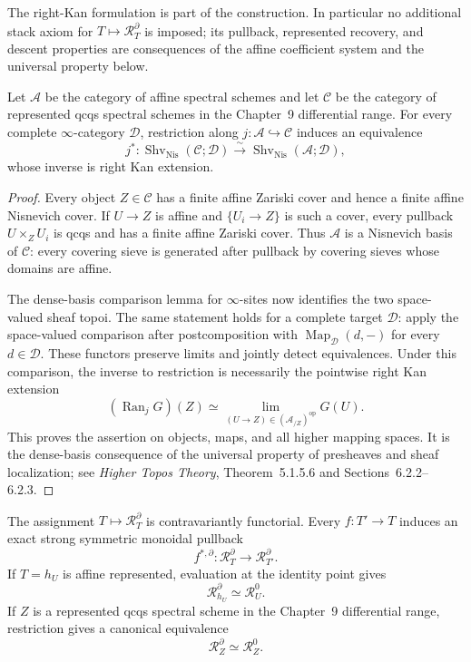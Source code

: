 The right-Kan formulation is part of the construction.  In particular no
additional stack axiom for $T\mapsto\mathcal R_T^{\partial}$ is imposed; its
pullback, represented recovery, and descent properties are consequences of the
affine coefficient system and the universal property below.

\begin{lemma}
\label{lem:prequantum-affine-nisnevich-basis-recovery}
Let $\mathcal A$ be the category of affine spectral schemes and let
$\mathcal C$ be the category of represented qcqs spectral schemes in the
Chapter~9 differential range.  For every complete $\infty$-category
$\mathcal D$, restriction along $j:\mathcal A\hookrightarrow\mathcal C$
induces an equivalence
\[
\boxed{
j^*:
\operatorname{Shv}_{\mathrm{Nis}}(\mathcal C;\mathcal D)
\xrightarrow{\ \sim\ }
\operatorname{Shv}_{\mathrm{Nis}}(\mathcal A;\mathcal D),
}
\]
whose inverse is right Kan extension.
\end{lemma}

\begin{proof}
Every object $Z\in\mathcal C$ has a finite affine Zariski cover and hence a
finite affine Nisnevich cover.  If $U\to Z$ is affine and
$\{U_i\to Z\}$ is such a cover, every pullback $U\times_ZU_i$ is qcqs and
has a finite affine Zariski cover.  Thus $\mathcal A$ is a Nisnevich basis of
$\mathcal C$: every covering sieve is generated after pullback by covering
sieves whose domains are affine.

The dense-basis comparison lemma for $\infty$-sites now identifies the two
space-valued sheaf topoi.  The same statement holds for a complete target
$\mathcal D$: apply the space-valued comparison after postcomposition with
$\operatorname{Map}_{\mathcal D}(d,-)$ for every $d\in\mathcal D$.  These
functors preserve limits and jointly detect equivalences.  Under this
comparison, the inverse to restriction is necessarily the pointwise right Kan
extension
\[
(\operatorname{Ran}_jG)(Z)
\simeq
\lim_{(U\to Z)\in(\mathcal A_{/Z})^{\mathrm{op}}}G(U).
\]
This proves the assertion on objects, maps, and all higher mapping spaces.  It
is the dense-basis consequence of the universal property of presheaves and
sheaf localization; see \emph{Higher Topos Theory},
Theorem~5.1.5.6 and Sections~6.2.2--6.2.3.
\end{proof}

\begin{proposition}
\label{prop:prequantum-big-differential-recovery-pullback}
The assignment $T\mapsto\mathcal R_T^{\partial}$ is contravariantly functorial.
Every $f:T'\to T$ induces an exact strong symmetric monoidal pullback
\[
f^{*,\partial}:\mathcal R_T^{\partial}
\longrightarrow
\mathcal R_{T'}^{\partial}.
\]
If $T=h_U$ is affine represented, evaluation at the identity point gives
\[
\boxed{
\mathcal R_{h_U}^{\partial}\simeq\mathcal R_U^0.
}
\]
If $Z$ is a represented qcqs spectral scheme in the Chapter~9 differential range,
restriction gives a canonical equivalence
\[
\boxed{
\mathcal R_Z^{\partial}\simeq\mathcal R_Z^0.
}
\]
\end{proposition}

